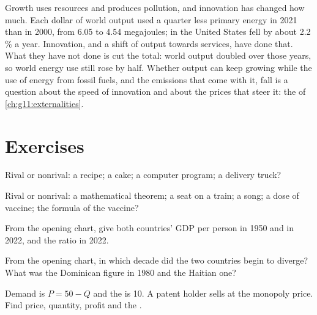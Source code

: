Growth uses resources and produces pollution, and innovation has changed how much. Each dollar of world output used a quarter less primary energy in 2021 than in 2000,
from 6.05 to 4.54 megajoules; in the United States  fell by about 2.2\,\% a year. Innovation, and a shift of output towards services, have done that. What they have not done is cut the total:
world output doubled over those years, so world energy use still rose by half. Whether output can keep growing while the use of energy from fossil fuels, and the emissions
that come with it, fall is a question about the speed of innovation and about the prices that steer it: the  of \cref{ch:g11:externalities}.

\section{Exercises}

\begin{exercise}[$\star$]\label{exo:g12:ideas-institutions-growth:1}
Rival or nonrival: a recipe; a cake; a computer program; a delivery truck?
\end{exercise}

\begin{exercise}[$\star$]\label{exo:g12:ideas-institutions-growth:2}
Rival or nonrival: a mathematical theorem; a seat on a train; a song; a dose of vaccine; the formula of the vaccine?
\end{exercise}

\begin{exercise}[$\star$]\label{exo:g12:ideas-institutions-growth:3}
From the opening chart, give both countries' GDP per person in 1950 and in 2022, and the ratio in 2022.
\end{exercise}

\begin{exercise}[$\star$]\label{exo:g12:ideas-institutions-growth:4}
From the opening chart, in which decade did the two countries begin to diverge? What was the Dominican figure in 1980 and the Haitian one?
\end{exercise}

\begin{exercise}[$\star$]\label{exo:g12:ideas-institutions-growth:5}
Demand is $P = 50 - Q$ and the  is 10. A patent holder sells at the monopoly price. Find price, quantity, profit and the .
\end{exercise}

